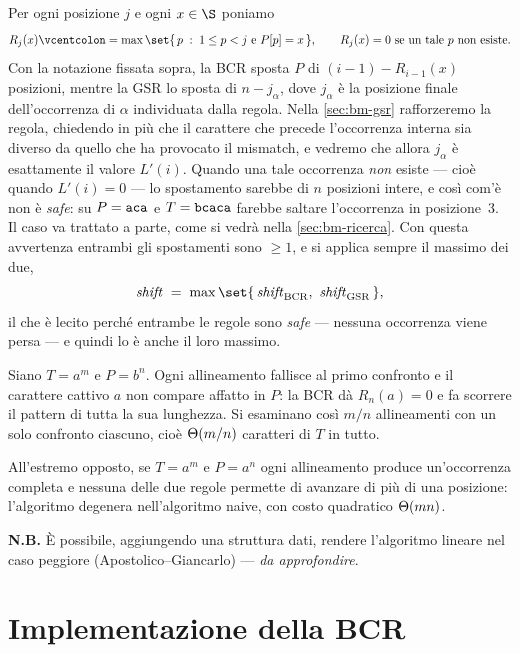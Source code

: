 \begin{osservazione}
Per ogni posizione $j$ e ogni $x\in\alfa$ poniamo
\[
  R_j(x) \defeq \max\set{\, p \;:\; 1\le p<j \ \text{e}\ P[p]=x \,},
  \qquad R_j(x)=0 \ \text{se un tale } p \text{ non esiste}.
\]
Con la notazione fissata sopra, la BCR sposta $P$ di $(i-1)-R_{i-1}(x)$ posizioni,
mentre la GSR lo sposta di $n-j_\alpha$, dove $j_\alpha$ è la posizione finale
dell'occorrenza di $\alpha$ individuata dalla regola. Nella \autoref{sec:bm-gsr}
rafforzeremo la regola, chiedendo in più che il carattere che precede
l'occorrenza interna sia diverso da quello che ha provocato il mismatch, e vedremo
che allora $j_\alpha$ è esattamente il valore $L'(i)$.
Quando una tale occorrenza \emph{non} esiste --- cioè quando $L'(i)=0$ --- lo
spostamento sarebbe di $n$ posizioni intere, e così com'è non è \emph{safe}: su
$P=\texttt{aca}$ e $T=\texttt{bcaca}$ farebbe saltare l'occorrenza in posizione~3. Il
caso va trattato a parte, come si vedrà nella \autoref{sec:bm-ricerca}.
Con questa avvertenza entrambi gli spostamenti sono $\ge 1$, e si applica sempre
il massimo dei due,
\[
  \mathit{shift} \;=\; \max\set{\,\mathit{shift}_{\mathrm{BCR}},\ \mathit{shift}_{\mathrm{GSR}}\,},
\]
il che è lecito perché entrambe le regole sono \emph{safe} --- nessuna occorrenza
viene persa --- e quindi lo è anche il loro massimo.
\end{osservazione}

\begin{esempio*}
Siano $T=a^{m}$ e $P=b^{n}$. Ogni allineamento fallisce al primo confronto e il
carattere cattivo $a$ non compare affatto in $P$: la BCR dà $R_n(a)=0$ e fa scorrere
il pattern di tutta la sua lunghezza. Si esaminano così $m/n$ allineamenti con un
solo confronto ciascuno, cioè $\Theta(m/n)$ caratteri di $T$ in tutto.
\end{esempio*}

\begin{osservazione}
All'estremo opposto, se $T=a^{m}$ e $P=a^{n}$ ogni allineamento produce
un'occorrenza completa e nessuna delle due regole permette di avanzare di più di una
posizione: l'algoritmo degenera nell'algoritmo naive, con costo quadratico
$\Theta(mn)$.
\end{osservazione}

\textbf{N.B.} È possibile, aggiungendo una struttura dati, rendere l'algoritmo
lineare nel caso peggiore (Apostolico--Giancarlo) --- \emph{da approfondire}.

\section{Implementazione della BCR}

